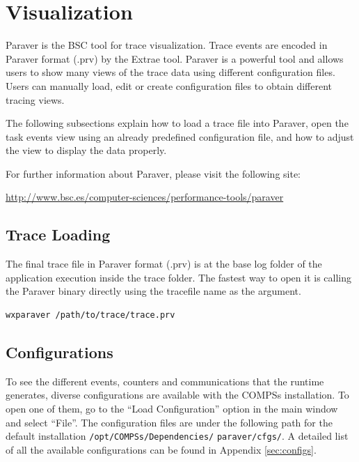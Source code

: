 \section{Visualization}
\label{sec:Visualization}

Paraver is the BSC tool for trace visualization. Trace events are encoded in Paraver format (.prv) by the Extrae tool. Paraver is a powerful
tool and allows users to show many views of the trace data using different configuration files. Users can manually load, edit or create
configuration files to obtain different tracing views. 

The following subsections explain how to load a trace file into Paraver, open the task events view using an already predefined 
configuration file, and how to adjust the view to display the data properly.

For further information about Paraver, please visit the following site:

\begin{center}
\url{http://www.bsc.es/computer-sciences/performance-tools/paraver}
\end{center}

\subsection{Trace Loading}
The final trace file in Paraver format (.prv) is at the base log folder of the application execution inside the trace folder. The fastest
way to open it is calling the Paraver binary directly using the tracefile name as the argument.

\begin{lstlisting}[language=bash]
wxparaver /path/to/trace/trace.prv
\end{lstlisting}
 
\subsection{Configurations}

To see the different events, counters and communications that the runtime generates, diverse configurations are available with the COMPSs
installation. To open one of them, go to the ``Load Configuration'' option in the main window and select ``File''. The configuration files
are under the following path for the default installation \verb|/opt/COMPSs/Dependencies/| \verb|paraver/cfgs/|. A detailed list of all the
available configurations can be found in Appendix \ref{sec:configs}.

